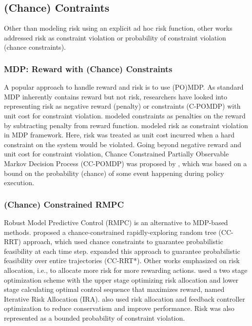 \documentclass[letterpaper]{article} %
\begin{document}
\subsection{(Chance) Contraints}
Other than modeling risk using an explicit ad hoc risk function, other works addressed risk as constraint violation or probability of constraint violation (chance constraints).

\subsubsection{MDP: Reward with (Chance) Constraints}
A popular approach to handle reward and risk is to use (PO)MDP. As standard MDP inherently contains reward but not risk, researchers have looked into representing risk as negative reward (penalty) or constraints (C-POMDP) with unit cost for constraint violation. \citeauthor{pereira2013risk} modeled constraints as penalties on the reward by subtracting penalty from reward function. \citeauthor{undurti2010online} modeled risk as constraint violation in MDP framework. Here, risk was treated as unit cost incurred when a hard constraint on the system would be violated. Going beyond negative reward and unit cost for constraint violation, Chance Constrained Partially Observable Markov Decision Process (CC-POMDP) was proposed by \citeauthor{santana2016rao}, which was based on a bound on the probability (chance) of some event happening during policy execution.

\subsubsection{(Chance) Constrained RMPC}
Robust Model Predictive Control (RMPC) is an alternative to MDP-based methods. \citeauthor{luders2010chance} proposed a chance-constrained rapidly-exploring random tree (CC-RRT) approach, which used chance constraints to guarantee probabilistic feasibility at each time step. \citeauthor{luders2013robust} expanded this approach to guarantee probabilistic feasibility over entire trajectories (CC-RRT*). Other works emphasized on risk allocation, i.e., to allocate more risk for more rewarding actions. \citeauthor{ono2008iterative}  used a two stage optimization scheme with the upper stage optimizing risk allocation and lower stage calculating optimal control sequence that maximizes reward, named Iterative Risk Allocation (IRA). \citeauthor{vitus2011feedback} also used risk allocation and feedback controller optimization to reduce conservatism and improve performance. Risk was also represented as a bounded probability of constraint violation.
\end{document}
